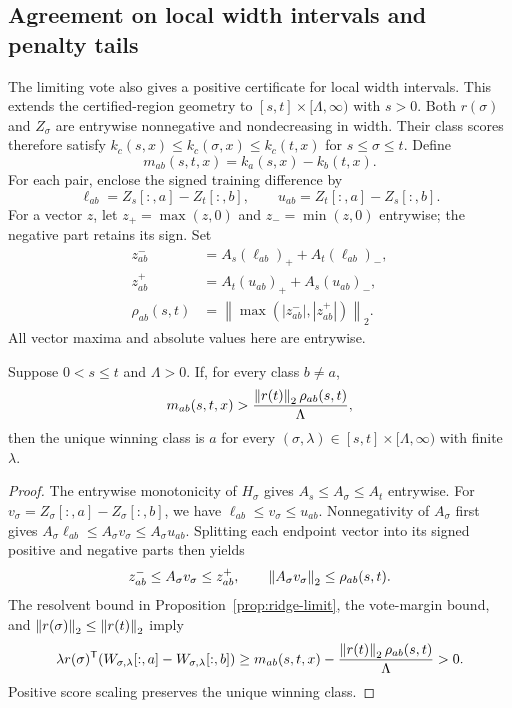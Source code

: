 \subsection{Agreement on local width intervals and penalty tails}
\label{sec:local-tail}
The limiting vote also gives a positive certificate for local width intervals.
This extends the certified-region geometry to $[s,t]\times[\Lambda,\infty)$
with $s>0$. Both $r(\sigma)$ and $Z_\sigma$ are entrywise nonnegative and
nondecreasing in width. Their class scores therefore satisfy
$k_c(s,x)\leq k_c(\sigma,x)\leq k_c(t,x)$ for $s\leq\sigma\leq t$.
Define
\[
 m_{ab}(s,t,x)=k_a(s,x)-k_b(t,x).
\]
For each pair, enclose the signed training difference by
\[
 \ell_{ab}=Z_s[:,a]-Z_t[:,b],\qquad
 u_{ab}=Z_t[:,a]-Z_s[:,b].
\]
For a vector $z$, let $z_+=\max(z,0)$ and $z_-=\min(z,0)$ entrywise;
the negative part retains its sign. Set
\begin{align*}
 z^-_{ab}&=A_s(\ell_{ab})_++A_t(\ell_{ab})_-,\\
 z^+_{ab}&=A_t(u_{ab})_++A_s(u_{ab})_-,\\
 \rho_{ab}(s,t)&=
 \left\|\max\left(|z^-_{ab}|,|z^+_{ab}|\right)\right\|_2.
\end{align*}
All vector maxima and absolute values here are entrywise.

\begin{theorem}
\label{thm:local-tail}
Suppose $0<s\leq t$ and $\Lambda>0$. If, for every class $b\ne a$,
\[
 m_{ab}(s,t,x)>
       \frac{\left\lVert r(t)\right\rVert_2\rho_{ab}(s,t)}{\Lambda},
\]
then the unique winning class is $a$ for every
$(\sigma,\lambda)\in[s,t]\times[\Lambda,\infty)$ with finite $\lambda$.
\end{theorem}
\begin{proof}
The entrywise monotonicity of $H_\sigma$ gives
$A_s\leq A_\sigma\leq A_t$ entrywise. For
$v_\sigma=Z_\sigma[:,a]-Z_\sigma[:,b]$, we have
$\ell_{ab}\leq v_\sigma\leq u_{ab}$. Nonnegativity of $A_\sigma$
first gives $A_\sigma\ell_{ab}\leq A_\sigma v_\sigma
\leq A_\sigma u_{ab}$. Splitting each endpoint vector into its signed
positive and negative parts then yields
\[
 z^-_{ab}\leq A_\sigma v_\sigma\leq z^+_{ab},\qquad
 \left\lVert A_\sigma v_\sigma\right\rVert_2\leq\rho_{ab}(s,t).
\]
The resolvent bound in Proposition~\ref{prop:ridge-limit}, the vote-margin
bound, and $\left\lVert r(\sigma)\right\rVert_2\leq\left\lVert r(t)\right\rVert_2$ imply
\[
 \lambda r(\sigma)^{\mathsf{T}}
 (W_{\sigma,\lambda}[:,a]-W_{\sigma,\lambda}[:,b])
 \geq m_{ab}(s,t,x)-
       \frac{\left\lVert r(t)\right\rVert_2\rho_{ab}(s,t)}{\Lambda}>0.
\]
Positive score scaling preserves the unique winning class.
\end{proof}


